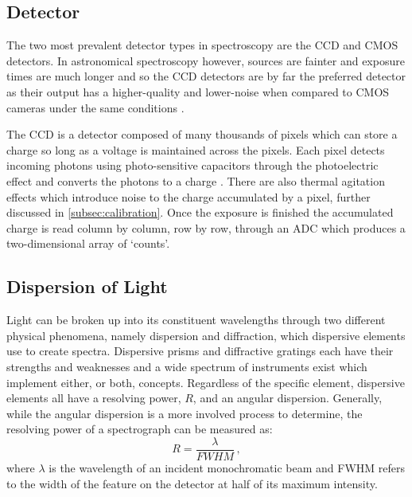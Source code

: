 \subsection{Detector}

The two most prevalent detector types in spectroscopy are the \gls{CCD} and \gls{CMOS} detectors. In astronomical spectroscopy however, sources are fainter and exposure times are much longer and so the \gls{CCD} detectors are by far the preferred detector as their output has a higher-quality and lower-noise when compared to \gls{CMOS} cameras under the same conditions \citep{CCDvsCMOS}.

The \gls{CCD} is a detector composed of many thousands of pixels which can store a charge so long as a voltage is maintained across the pixels. Each pixel detects incoming photons using photo-sensitive capacitors through the photoelectric effect and converts the photons to a charge \citep{CCDastronomy}. There are also thermal agitation effects which introduce noise to the charge accumulated by a pixel, further discussed in \autoref{subsec:calibration}. Once the exposure is finished the accumulated charge is read column by column, row by row, through an \gls{ADC}  which produces a two-dimensional array of `counts'.


\subsection{Dispersion of Light} \label{subsec:dispersion}

Light can be broken up into its constituent wavelengths through two different physical phenomena, namely dispersion and diffraction, which dispersive elements use to create spectra. Dispersive prisms and diffractive gratings each have their strengths and weaknesses and a wide spectrum of instruments exist which implement either, or both, concepts. Regardless of the specific element, dispersive elements all have a resolving power, $R$, and an angular dispersion. Generally, while the angular dispersion is a more involved process to determine, the resolving power of a spectrograph can be measured as:
\begin{equation} \label{eq:resolving_power}
    R = \frac{\lambda}{FWHM}\,,
\end{equation}
where $\lambda$ is the wavelength of an incident monochromatic beam and \gls{FWHM} refers to the width of the feature on the detector at half of its maximum intensity.

